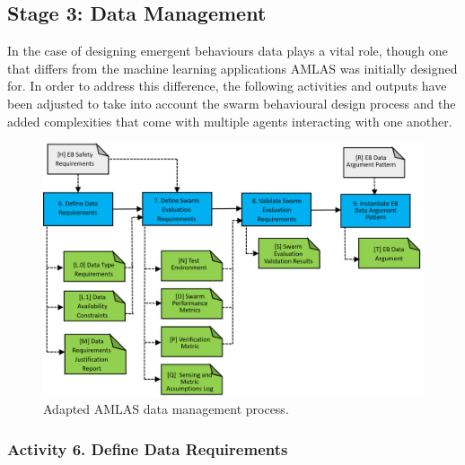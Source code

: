 \documentclass[lettersize,journal]{IEEEtran}
\begin{document}
\subsection{Stage 3: Data Management} \label{framework-stage3}

In the case of designing emergent behaviours data plays a vital role, though one that differs from the machine learning applications AMLAS was initially designed for. In order to address this difference, the following activities and outputs have been adjusted to take into account the swarm behavioural design process and the added complexities that come with multiple agents interacting with one another.

\begin{figure}
	\centering
	\includegraphics[width=1.0\textwidth]{figures/Stage3_DM.png}
	\caption{Adapted AMLAS data management process.}
	\label{amlas-a-stage3}
\end{figure}

\subsubsection*{Activity 6. Define Data Requirements}
\end{document}
